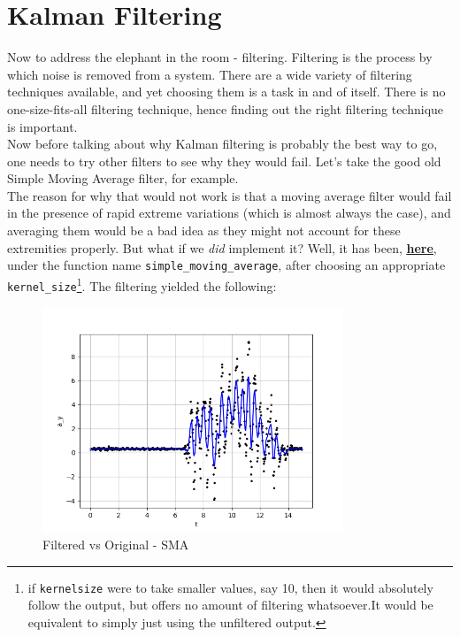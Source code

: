 \documentclass[oneside]{book}
\begin{document}
\chapter{Kalman Filtering} \label{Kalman Filter chapter}
Now to address the elephant in the room - filtering. Filtering is the process by which noise is removed from a system. There are a wide variety of filtering techniques available, and yet choosing them is a task in and of itself. There is no one-size-fits-all filtering technique, hence finding out the right filtering technique is important.\\ 
\bigskip
Now before talking about why Kalman filtering is probably the best way to go, one needs to try other filters to see why they would fail. Let's take the good old Simple Moving Average filter, for example. \\
The reason for why that would not work is that a moving average filter would fail in the presence of rapid extreme variations (which is almost always the case), and averaging them would be a bad idea as they might not account for these extremities properly.
But what if we \textit{did} implement it? Well, it has been, \href{https://github.com/HarryNyquist/Odometry/blob/main/Odometry_Bad_Tries/Bad_Filter_attempts.py}{\underline{\textbf{here}}}, under the function name \verb|simple_moving_average|, after choosing an appropriate \\ \verb|kernel_size|\footnote{if \texttt{kernel\textunderscore size} were to take smaller values, say 10, then it would absolutely follow the output, but offers no amount of filtering whatsoever.It would be equivalent to simply just using the unfiltered output.}. The filtering yielded the following:
\begin{figure}[htbp]
    \centering
    \includegraphics[width=0.8\textwidth]{figs/Filtered_using_SMA_downsampled.png}
    \caption{Filtered vs Original - SMA}
\end{figure}
\end{document}
